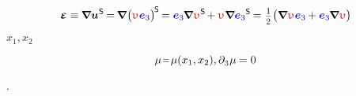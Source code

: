 \nopagebreak\vspace{-0.25em}
\begin{equation}
\infinitesimaldeformation
\equiv \hspace{-0.1ex}
\boldnabla {\bm{u}}^{\hspace{.1ex}\mathsf{S}} \hspace{-0.2ex}
= \hspace{-0.2ex}
\boldnabla \hspace{.1ex} \bigl(
   \antiplanedisplacement
   \hspace{.1ex}
   \mathcolor{blue}{\bm{e}_3}
\bigr)^{\hspace{-0.2ex} \mathsf{S} } \hspace{-0.25ex}
   = \mathcolor{blue}{\bm{e}_3}
   \hspace{-0.15ex} \boldnabla \hspace{.1ex}
   \antiplanedisplacement^{\hspace{.1ex}\mathsf{S}}
   \hspace{-0.25ex} +
   \antiplanedisplacement \hspace{.1ex}
   \tikzmark{beginZero2}
      \boldnabla
      \mathcolor{blue}{\bm{e}_3}
   \tikzmark{endZero2}^{\mathsf{S}} \hspace{-0.2ex}
   = \hspace{.1ex}
   \smalldisplaystyleonehalf \hspace{.1ex}
   \bigl(
      \boldnabla \hspace{.1ex} \antiplanedisplacement \hspace{.12ex}
      \mathcolor{blue}{\bm{e}_3} \hspace{-0.1ex}
      + \mathcolor{blue}{\bm{e}_3} \hspace{-0.15ex}
      \boldnabla \hspace{.1ex} \antiplanedisplacement
   \bigr)
\end{equation}%
%

${x_1, x_2}$
 
\begin{equation*}
\mu \narroweq \mu(x_1, x_2) ,
\partial_{
   \raisemath{-0.15ex}{ \mathcolor{blue}{3} }
} \hspace{.08ex} \mu \hspace{-0.1ex} = 0
\end{equation*}

.

